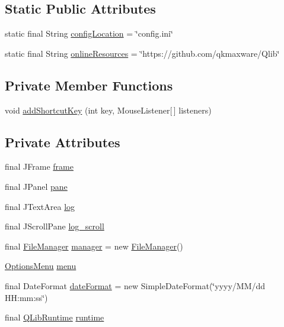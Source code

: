 \subsection*{Static Public Attributes}
\begin{DoxyCompactItemize}
\item 
static final String \hyperlink{classqlib_1_1ide_1_1QLibIDE_ae54da93b399d4d027f33c04ba7e392fd}{config\+Location} = \char`\"{}config.\+ini\char`\"{}
\item 
static final String \hyperlink{classqlib_1_1ide_1_1QLibIDE_aeaa0895eee29e9d5cf4e657134d56803}{online\+Resources} = \char`\"{}https\+://github.\+com/qkmaxware/Qlib\char`\"{}
\end{DoxyCompactItemize}
\subsection*{Private Member Functions}
\begin{DoxyCompactItemize}
\item 
void \hyperlink{classqlib_1_1ide_1_1QLibIDE_a6f9aa8bdf86b91b456239c96202d2e3f}{add\+Shortcut\+Key} (int key, Mouse\+Listener\mbox{[}$\,$\mbox{]} listeners)
\end{DoxyCompactItemize}
\subsection*{Private Attributes}
\begin{DoxyCompactItemize}
\item 
final J\+Frame \hyperlink{classqlib_1_1ide_1_1QLibIDE_a13a62cb428150031089c3824f16d6bef}{frame}
\item 
final J\+Panel \hyperlink{classqlib_1_1ide_1_1QLibIDE_a599d44725656f74ca6d6fc028b8973a8}{pane}
\item 
final J\+Text\+Area \hyperlink{classqlib_1_1ide_1_1QLibIDE_aa92d671c5f0158e59c86767109afc92c}{log}
\item 
final J\+Scroll\+Pane \hyperlink{classqlib_1_1ide_1_1QLibIDE_a74ee30733f7d424f2e518f1171d70917}{log\+\_\+scroll}
\item 
final \hyperlink{classqlib_1_1ide_1_1FileManager}{File\+Manager} \hyperlink{classqlib_1_1ide_1_1QLibIDE_a5af68fc042aeee1b69f27f3e1e67610b}{manager} = new \hyperlink{classqlib_1_1ide_1_1FileManager}{File\+Manager}()
\item 
\hyperlink{classqlib_1_1ide_1_1OptionsMenu}{Options\+Menu} \hyperlink{classqlib_1_1ide_1_1QLibIDE_ae822573114cbc618b4af0ddf3726b06b}{menu}
\item 
final Date\+Format \hyperlink{classqlib_1_1ide_1_1QLibIDE_ac1128e9b1f1d79af9c480383ab6a16ac}{date\+Format} = new Simple\+Date\+Format(\char`\"{}yyyy/MM/dd H\+H\+:mm\+:ss\char`\"{})
\item 
final \hyperlink{classqlib_1_1ide_1_1QLibRuntime}{Q\+Lib\+Runtime} \hyperlink{classqlib_1_1ide_1_1QLibIDE_a07b6d9558a76bd5d818a98debdb93d5f}{runtime}
\end{DoxyCompactItemize}


